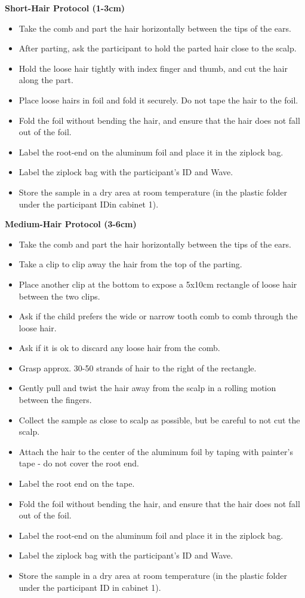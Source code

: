 \documentclass[]{book}
\providecommand{\tightlist}{%
  \setlength{\itemsep}{0pt}\setlength{\parskip}{0pt}}
\begin{document}
\textbf{Short-Hair Protocol (1-3cm)}

\begin{itemize}
\tightlist
\item
  Take the comb and part the hair horizontally between the tips of the ears.
\item
  After parting, ask the participant to hold the parted hair close to the scalp.
\item
  Hold the loose hair tightly with index finger and thumb, and cut the hair along the part.
\item
  Place loose hairs in foil and fold it securely. Do not tape the hair to the foil.
\item
  Fold the foil without bending the hair, and ensure that the hair does not fall out of the foil.
\item
  Label the root-end on the aluminum foil and place it in the ziplock bag.
\item
  Label the ziplock bag with the participant's ID and Wave.
\item
  Store the sample in a dry area at room temperature (in the plastic folder under the participant IDin cabinet 1).
\end{itemize}

\textbf{Medium-Hair Protocol (3-6cm)}

\begin{itemize}
\tightlist
\item
  Take the comb and part the hair horizontally between the tips of the ears.
\item
  Take a clip to clip away the hair from the top of the parting.
\item
  Place another clip at the bottom to expose a 5x10cm rectangle of loose hair between the two clips.
\item
  Ask if the child prefers the wide or narrow tooth comb to comb through the loose hair.
\item
  Ask if it is ok to discard any loose hair from the comb.
\item
  Grasp approx. 30-50 strands of hair to the right of the rectangle.
\item
  Gently pull and twist the hair away from the scalp in a rolling motion between the fingers.
\item
  Collect the sample as close to scalp as possible, but be careful to not cut the scalp.
\item
  Attach the hair to the center of the aluminum foil by taping with painter's tape - do not cover the root end.
\item
  Label the root end on the tape.
\item
  Fold the foil without bending the hair, and ensure that the hair does not fall out of the foil.
\item
  Label the root-end on the aluminum foil and place it in the ziplock bag.
\item
  Label the ziplock bag with the participant's ID and Wave.
\item
  Store the sample in a dry area at room temperature (in the plastic folder under the participant ID in cabinet 1).
\end{itemize}
\end{document}
